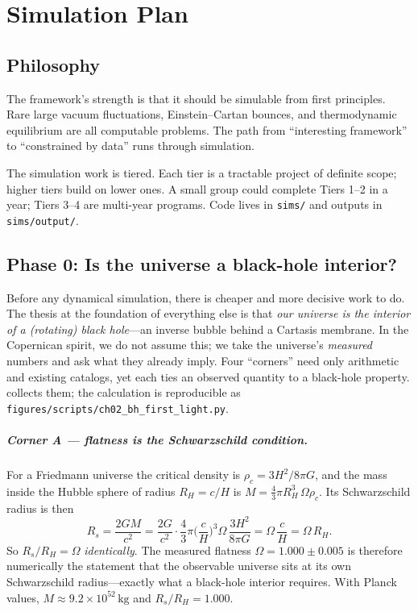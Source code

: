 \chapter{Simulation Plan}
\label{chap:sims}

\section{Philosophy}

The framework's strength is that it should be simulable from first principles.
Rare large vacuum fluctuations, Einstein--Cartan bounces, and thermodynamic
equilibrium are all computable problems. The path from ``interesting framework''
to ``constrained by data'' runs through simulation.

The simulation work is tiered. Each tier is a tractable project of definite
scope; higher tiers build on lower ones. A small group could complete Tiers 1--2
in a year; Tiers 3--4 are multi-year programs. Code lives in \texttt{sims/} and
outputs in \texttt{sims/output/}.

\section{Phase 0: Is the universe a black-hole interior?}
\label{sec:phase0}

Before any dynamical simulation, there is cheaper and more decisive work to do.
The thesis at the foundation of everything else is that \emph{our universe is the
interior of a (rotating) black hole}---an inverse bubble behind a Cartasis
membrane. In the Copernican spirit, we do not assume this; we take the
universe's \emph{measured} numbers and ask what they already imply. Four
``corners'' need only arithmetic and existing catalogs, yet each ties an
observed quantity to a black-hole property.  collects them;
the calculation is reproducible as \texttt{figures/scripts/ch02\_bh\_first\_light.py}.

\paragraph{Corner A --- flatness is the Schwarzschild condition.} For a
Friedmann universe the critical density is $\rho_c = 3H^2/8\pi G$, and the mass
inside the Hubble sphere of radius $R_H = c/H$ is
$M = \tfrac{4}{3}\pi R_H^3\,\Omega\rho_c$. Its Schwarzschild radius is then
\[
  R_s = \frac{2GM}{c^2}
      = \frac{2G}{c^2}\cdot\frac{4}{3}\pi\Big(\frac{c}{H}\Big)^{3}\Omega\,
        \frac{3H^2}{8\pi G}
      = \Omega\,\frac{c}{H} = \Omega\,R_H .
\]
So $R_s/R_H = \Omega$ \emph{identically}. The measured flatness
$\Omega = 1.000 \pm 0.005$ is therefore numerically the statement that the
observable universe sits at its own Schwarzschild radius---exactly what a
black-hole interior requires. With Planck values,
$M \approx 9.2\times10^{52}\,\mathrm{kg}$ and $R_s/R_H = 1.000$.

